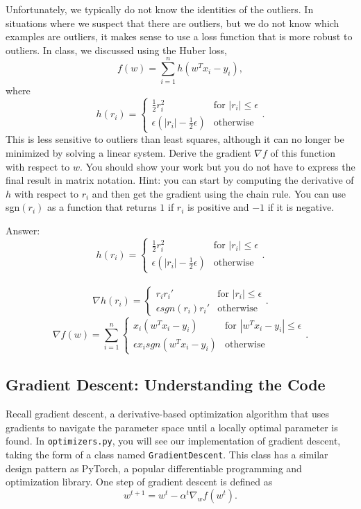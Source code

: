 \documentclass{article}
\newcommand{\blu}[1]{{\textcolor{blu}{#1}}}
\newcommand{\gre}[1]{\textcolor{gre}{#1}}
\newcommand\ans[1]{\par\gre{Answer: #1}}
\def\half{\frac 1 2}
\begin{document}
Unfortunately, we typically do not know the identities of the outliers. In situations where we suspect that there are outliers, but we do not know which examples are outliers, it makes sense to use a loss function that is more robust to outliers. In class, we discussed using the Huber loss,
\[
f(w) = \sum_{i=1}^n h(w^Tx_i  -y_i),
\]
where
\[
h(r_i) =
\begin{cases}
\half r_i^2 & \text{for $|r_i| \leq \epsilon$}\\
\epsilon(|r_i| - \half \epsilon) & \text{otherwise}
\end{cases}.
\]
This is less sensitive to outliers than least squares, although it can no longer be minimized by solving a linear system. \blu{Derive
 the gradient $\nabla f$ of this function with respect to $w$. You should show your work but you do not have to express the final result in matrix notation.}
 Hint: you can start by computing the derivative of $h$ with respect to $r_i$ and then get the gradient using the chain rule. You can use sgn$(r_i)$ as a function that returns $1$ if $r_i$ is positive and $-1$ if it is negative.
\ans{\\
\[
h(r_i) =
\begin{cases}
\half r_i^2 & \text{for $|r_i| \leq \epsilon$}\\
\epsilon(|r_i| - \half \epsilon) & \text{otherwise}
\end{cases}.
\]\\
\[
\nabla h(r_i) =
\begin{cases}
r_i r_i' & \text{for $|r_i| \leq \epsilon$}\\
\epsilon sgn(r_i)r_i' & \text{otherwise}
\end{cases}.
\]
\[
\nabla f(w) = \sum_{i=1}^n
\begin{cases}
 x_i(w^Tx_i-y_i) & \text{for $|w^Tx_i-y_i| \leq \epsilon$}\\
\epsilon x_i sgn(w^Tx_i-y_i) & \text{otherwise}
\end{cases}.
\]}
\pagebreak

\subsection{Gradient Descent: Understanding the Code }

Recall gradient descent, a derivative-based optimization algorithm that uses gradients to navigate the parameter space until a locally optimal parameter is found. In \texttt{optimizers.py}, you will see our implementation of gradient descent, taking the form of a class named \texttt{GradientDescent}. This class has a similar design pattern as PyTorch, a popular differentiable programming and optimization library. One step of gradient descent is defined as
\[
	w^{t+1} = w^t - \alpha^t \nabla_w f(w^t)
.\]
\end{document}
